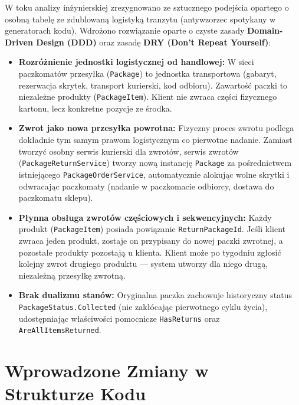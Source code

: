 \documentclass[10.5pt,a4paper]{article}
\begin{document}
W toku analizy inżynierskiej zrezygnowano ze sztucznego podejścia opartego o osobną tabelę ze zdublowaną logistyką tranzytu (antywzorzec spotykany w generatorach kodu). Wdrożono rozwiązanie oparte o czyste zasady \textbf{Domain-Driven Design (DDD)} oraz zasadę \textbf{DRY (Don't Repeat Yourself)}:

\begin{itemize}[leftmargin=*,itemsep=2pt]
    \item \textbf{Rozróżnienie jednostki logistycznej od handlowej:}
    W sieci paczkomatów przesyłka (\texttt{Package}) to jednostka transportowa (gabaryt, rezerwacja skrytek, transport kurierski, kod odbioru). Zawartość paczki to niezależne produkty (\texttt{PackageItem}). Klient nie zwraca części fizycznego kartonu, lecz konkretne pozycje ze środka.
    \item \textbf{Zwrot jako nowa przesyłka powrotna:}
    Fizyczny proces zwrotu podlega dokładnie tym samym prawom logistycznym co pierwotne nadanie. Zamiast tworzyć osobny serwis kurierski dla zwrotów, serwis zwrotów (\texttt{PackageReturnService}) tworzy nową instancję \texttt{Package} za pośrednictwem istniejącego \texttt{PackageOrderService}, automatycznie alokując wolne skrytki i odwracając paczkomaty (nadanie w paczkomacie odbiorcy, dostawa do paczkomatu sklepu).
    \item \textbf{Płynna obsługa zwrotów częściowych i sekwencyjnych:}
    Każdy produkt (\texttt{PackageItem}) posiada powiązanie \texttt{ReturnPackageId}. Jeśli klient zwraca jeden produkt, zostaje on przypisany do nowej paczki zwrotnej, a pozostałe produkty pozostają u klienta. Klient może po tygodniu zgłosić kolejny zwrot drugiego produktu --- system utworzy dla niego drugą, niezależną przesyłkę zwrotną.
    \item \textbf{Brak dualizmu stanów:}
    Oryginalna paczka zachowuje historyczny status \texttt{PackageStatus.Collected} (nie zakłócając pierwotnego cyklu życia), udostępniając właściwości pomocnicze \texttt{HasReturns} oraz \texttt{AreAllItemsReturned}.
\end{itemize}

\section{Wprowadzone Zmiany w Strukturze Kodu}
\end{document}
